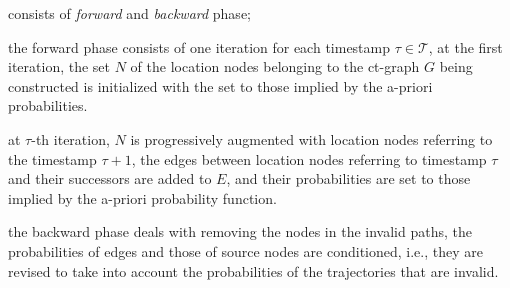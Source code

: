 \begin{frame}
\begin{columns}
  \begin{sitemize}
    \item consists of \emph{forward} and \emph{backward} phase;
    \item the forward phase consists of one iteration for each timestamp $\tau \in \mathcal{T}$, at the first iteration, the set $N$ of the location nodes belonging to the ct-graph $G$ being constructed is initialized with the set to those implied by the a-priori probabilities.
    \item at $\tau$-th iteration, $N$ is progressively augmented with location nodes referring to the timestamp $\tau+1$, the edges between location nodes referring to timestamp $\tau$ and their successors are added to $E$, and their probabilities are set to those implied by the a-priori probability function.
    \item the backward phase deals with removing the nodes in the invalid paths, the probabilities of edges and those of source nodes are conditioned, i.e., they are revised to take into account the probabilities of the trajectories that are invalid.
  \end{sitemize}

\end{columns}

\end{frame}


